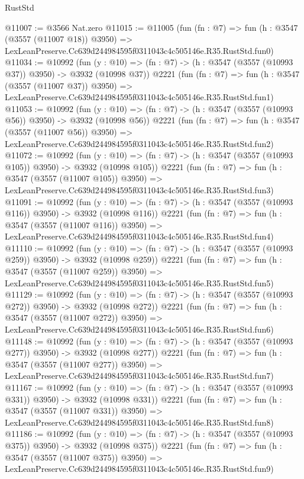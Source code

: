 \begin{lexlean}{RustStd}
\begin{coremodule}
@11007 := @3566 Nat.zero
@11015 := @11005
    (fun (fn : @7) =>
    fun (h : @3547 (@3557 (@11007 @18)) @3950) =>
    LexLeanPreserve.Cc639d244984595f0311043c4c505146e.R35.RustStd.fun0)
@11034 := @10992
    (fun (y : @10) => (fn : @7) -> (h : @3547 (@3557 (@10993 @37)) @3950) -> @3932 (@10998 @37))
    @2221
    (fun (fn : @7) =>
    fun (h : @3547 (@3557 (@11007 @37)) @3950) =>
    LexLeanPreserve.Cc639d244984595f0311043c4c505146e.R35.RustStd.fun1)
@11053 := @10992
    (fun (y : @10) => (fn : @7) -> (h : @3547 (@3557 (@10993 @56)) @3950) -> @3932 (@10998 @56))
    @2221
    (fun (fn : @7) =>
    fun (h : @3547 (@3557 (@11007 @56)) @3950) =>
    LexLeanPreserve.Cc639d244984595f0311043c4c505146e.R35.RustStd.fun2)
@11072 := @10992
    (fun (y : @10) => (fn : @7) -> (h : @3547 (@3557 (@10993 @105)) @3950) -> @3932 (@10998 @105))
    @2221
    (fun (fn : @7) =>
    fun (h : @3547 (@3557 (@11007 @105)) @3950) =>
    LexLeanPreserve.Cc639d244984595f0311043c4c505146e.R35.RustStd.fun3)
@11091 := @10992
    (fun (y : @10) => (fn : @7) -> (h : @3547 (@3557 (@10993 @116)) @3950) -> @3932 (@10998 @116))
    @2221
    (fun (fn : @7) =>
    fun (h : @3547 (@3557 (@11007 @116)) @3950) =>
    LexLeanPreserve.Cc639d244984595f0311043c4c505146e.R35.RustStd.fun4)
@11110 := @10992
    (fun (y : @10) => (fn : @7) -> (h : @3547 (@3557 (@10993 @259)) @3950) -> @3932 (@10998 @259))
    @2221
    (fun (fn : @7) =>
    fun (h : @3547 (@3557 (@11007 @259)) @3950) =>
    LexLeanPreserve.Cc639d244984595f0311043c4c505146e.R35.RustStd.fun5)
@11129 := @10992
    (fun (y : @10) => (fn : @7) -> (h : @3547 (@3557 (@10993 @272)) @3950) -> @3932 (@10998 @272))
    @2221
    (fun (fn : @7) =>
    fun (h : @3547 (@3557 (@11007 @272)) @3950) =>
    LexLeanPreserve.Cc639d244984595f0311043c4c505146e.R35.RustStd.fun6)
@11148 := @10992
    (fun (y : @10) => (fn : @7) -> (h : @3547 (@3557 (@10993 @277)) @3950) -> @3932 (@10998 @277))
    @2221
    (fun (fn : @7) =>
    fun (h : @3547 (@3557 (@11007 @277)) @3950) =>
    LexLeanPreserve.Cc639d244984595f0311043c4c505146e.R35.RustStd.fun7)
@11167 := @10992
    (fun (y : @10) => (fn : @7) -> (h : @3547 (@3557 (@10993 @331)) @3950) -> @3932 (@10998 @331))
    @2221
    (fun (fn : @7) =>
    fun (h : @3547 (@3557 (@11007 @331)) @3950) =>
    LexLeanPreserve.Cc639d244984595f0311043c4c505146e.R35.RustStd.fun8)
@11186 := @10992
    (fun (y : @10) => (fn : @7) -> (h : @3547 (@3557 (@10993 @375)) @3950) -> @3932 (@10998 @375))
    @2221
    (fun (fn : @7) =>
    fun (h : @3547 (@3557 (@11007 @375)) @3950) =>
    LexLeanPreserve.Cc639d244984595f0311043c4c505146e.R35.RustStd.fun9)

\end{coremodule}
\end{lexlean}
